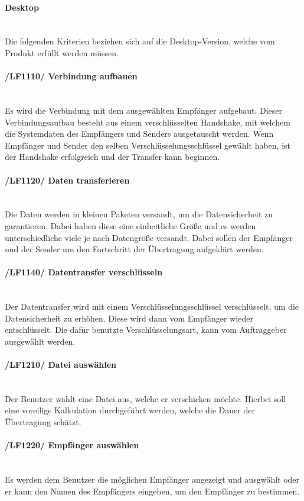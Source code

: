 \begin{indentE}\mbox{}
	\paragraph{Desktop}\mbox{}\\
	Die folgenden Kriterien beziehen sich auf die Desktop-Version, welche vom Produkt erfüllt werden müssen.
	\paragraph{/LF1110/ Verbindung aufbauen}\mbox{}\\
	Es wird die Verbindung mit dem ausgewählten Empfänger aufgebaut. Dieser Verbindungsaufbau besteht aus einem verschlüsselten Handshake, mit welchem die Systemdaten des Empfängers und Senders ausgetauscht werden. Wenn Empfänger und Sender den selben Verschlüsselungsschlüssel gewählt haben, ist der Handshake erfolgreich und der Transfer kann beginnen.
	\paragraph{/LF1120/ Daten transferieren}\mbox{}\\
	Die Daten werden in kleinen Paketen versandt, um die Datensicherheit zu garantieren. Dabei haben diese eine einheitliche Größe und es werden unterschiedliche viele je nach Datengröße versandt. Dabei sollen der Empfänger und der Sender um den Fortschritt der Übertragung aufgeklärt werden.
	\paragraph{/LF1140/ Datentransfer verschlüsseln}\mbox{}\\
	Der Datentransfer wird mit einem Verschlüsselungsschlüssel verschlüsselt, um die Datensicherheit zu erhöhen. Diese wird dann vom Empfänger wieder entschlüsselt. Die dafür benutzte Verschlüsselungsart, kann vom Auftraggeber ausgewählt werden.
	\paragraph{/LF1210/ Datei auswählen}\mbox{}\\
	Der Benutzer wählt eine Datei aus, welche er verschicken möchte. Hierbei soll eine voreilige Kalkulation durchgeführt werden, welche die Dauer der Übertragung schätzt.
	\paragraph{/LF1220/ Empfänger auswählen}\mbox{}\\
	Es werden dem Benutzer die möglichen Empfänger angezeigt und ausgwählt oder er kann den Namen des Empfängers eingeben, um den Empfänger zu bestimmen.

\end{indentE}
